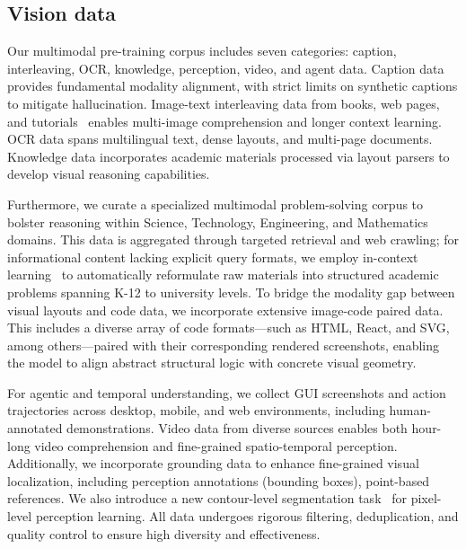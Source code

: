 \documentclass{article}
\newcommand{\citep}[1]{\parencite{#1}}
\begin{document}
\subsection{Vision data}
Our multimodal pre-training corpus includes seven categories: caption, interleaving, OCR, knowledge, perception, video, and agent data. Caption data~\citep{schuhmann2022laion, gadre2024datacomp} provides fundamental modality alignment, with strict limits on synthetic captions to mitigate hallucination. Image-text interleaving data from books, web pages, and tutorials~\citep{zhu2024multimodal,laurenccon2024obelics} enables multi-image comprehension and longer context learning. OCR data spans multilingual text, dense layouts, and multi-page documents. Knowledge data incorporates academic materials processed via layout parsers to develop visual reasoning capabilities.

Furthermore, we curate a specialized multimodal problem-solving corpus to bolster reasoning within Science, Technology, Engineering, and Mathematics domains. This data is aggregated through targeted retrieval and web crawling; for informational content lacking explicit query formats, we employ in-context learning~\citep{brown2020languagemodelsfewshotlearners} to automatically reformulate raw materials into structured academic problems spanning K-12 to university levels. To bridge the modality gap between visual layouts and code data, we incorporate extensive image-code paired data. This includes a diverse array of code formats—such as HTML, React, and SVG, among others—paired with their corresponding rendered screenshots, enabling the model to align abstract structural logic with concrete visual geometry.

For agentic and temporal understanding, we collect GUI screenshots and action trajectories across desktop, mobile, and web environments, including human-annotated demonstrations. Video data from diverse sources enables both hour-long video comprehension and fine-grained spatio-temporal perception. Additionally, we incorporate grounding data to enhance fine-grained visual localization, including perception annotations (bounding boxes), point-based references. We also introduce a new contour-level segmentation task~\citep{song2026pixellevelvlmperceptionsimple} for pixel-level perception learning. All data undergoes rigorous filtering, deduplication, and quality control to ensure high diversity and effectiveness.
\end{document}
